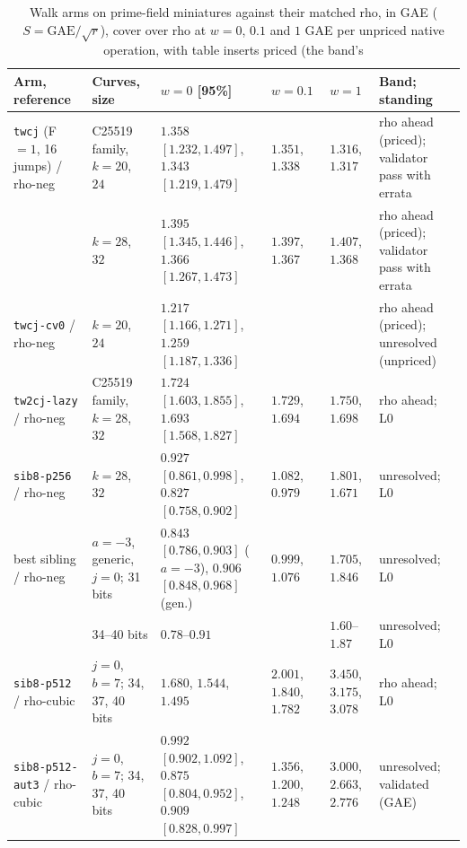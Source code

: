 \begin{table}[t]
\centering\small
\setlength{\tabcolsep}{3.5pt}
\begin{tabularx}{\linewidth}{@{}>{\raggedright}p{3.2cm}>{\raggedright}p{1.7cm}>{\raggedright}p{3.0cm}>{\raggedright}p{1.0cm}>{\raggedright}p{1.0cm}>{\raggedright\arraybackslash}X@{}}
\toprule
Arm, reference & Curves, size & $w=0$ [95\%] & $w=0.1$ & $w=1$ & Band; standing \\
\midrule
\texttt{twcj} (F$=1$, 16 jumps) / rho-neg & C25519 family, $k=20$, $24$ & $1.358$ $[1.232,1.497]$, $1.343$ $[1.219,1.479]$ & $1.351$, $1.338$ & $1.316$, $1.317$ & rho ahead (priced); validator pass with errata \\
 & $k=28$, $32$ & $1.395$ $[1.345,1.446]$, $1.366$ $[1.267,1.473]$ & $1.397$, $1.367$ & $1.407$, $1.368$ & rho ahead (priced); validator pass with errata \\
\texttt{twcj-cv0} / rho-neg & $k=20$, $24$ & $1.217$ $[1.166,1.271]$, $1.259$ $[1.187,1.336]$ & & & rho ahead (priced); unresolved (unpriced) \\
\addlinespace
\texttt{tw2cj-lazy} / rho-neg & C25519 family, $k=28$, $32$ & $1.724$ $[1.603,1.855]$, $1.693$ $[1.568,1.827]$ & $1.729$, $1.694$ & $1.750$, $1.698$ & rho ahead; L0 \\
\texttt{sib8-p256} / rho-neg & $k=28$, $32$ & $0.927$ $[0.861,0.998]$, $0.827$ $[0.758,0.902]$ & $1.082$, $0.979$ & $1.801$, $1.671$ & unresolved; L0 \\
best sibling / rho-neg & $a=-3$, generic, $j=0$; 31 bits & $0.843$ $[0.786,0.903]$ ($a=-3$), $0.906$ $[0.848,0.968]$ (gen.) & $0.999$, $1.076$ & $1.705$, $1.846$ & unresolved; L0 \\
 & 34--40 bits & $0.78$--$0.91$ & & $1.60$--$1.87$ & unresolved; L0 \\
\addlinespace
\texttt{sib8-p512} / rho-cubic & $j=0$, $b=7$; 34, 37, 40 bits & $1.680$, $1.544$, $1.495$ & $2.001$, $1.840$, $1.782$ & $3.450$, $3.175$, $3.078$ & rho ahead; L0 \\
\texttt{sib8-p512-aut3} / rho-cubic & $j=0$, $b=7$; 34, 37, 40 bits & $0.992$ $[0.902,1.092]$, $0.875$ $[0.804,0.952]$, $0.909$ $[0.828,0.997]$ & $1.356$, $1.200$, $1.248$ & $3.000$, $2.663$, $2.776$ & unresolved; validated (GAE) \\
\bottomrule
\end{tabularx}
\caption[]{Walk arms on prime-field miniatures against their matched rho,
in GAE ($S=\mathrm{GAE}/\sqrt r$), cover over rho at $w=0$, $0.1$ and $1$
GAE per unpriced native operation, with table inserts priced (the band's
}
\end{table}

